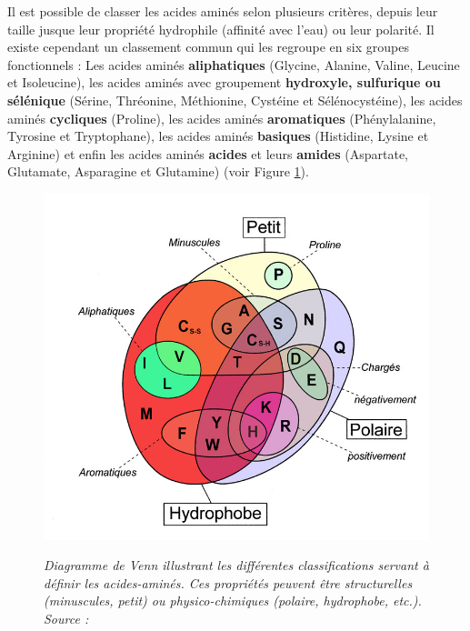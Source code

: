 

Il est possible de classer les acides aminés selon plusieurs critères, depuis leur taille jusque leur propriété hydrophile (affinité avec l'eau) ou leur polarité. Il existe cependant un classement commun qui les regroupe en six groupes fonctionnels : Les acides aminés \textbf{aliphatiques} (Glycine, Alanine, Valine, Leucine et Isoleucine), les acides aminés avec groupement \textbf{hydroxyle, sulfurique ou sélénique} (Sérine, Thréonine, Méthionine, Cystéine et Sélénocystéine), les acides aminés \textbf{cycliques} (Proline), les acides aminés \textbf{aromatiques} (Phénylalanine, Tyrosine et Tryptophane), les acides aminés \textbf{basiques} (Histidine, Lysine et Arginine) et enfin les acides aminés \textbf{acides} et leurs \textbf{amides} (Aspartate, Glutamate, Asparagine et Glutamine) (voir Figure \ref{Fig:diagramme_venn}).

\begin{figure}
  \centering
  {\includegraphics[width=0.65\linewidth]{./figures/ch1/diagramme_venn}}
    \caption[Diagramme de Venn illustrant les différentes classifications servant à définir les acides-aminés.]{\it Diagramme de Venn illustrant les différentes classifications servant à définir les acides-aminés. Ces propriétés peuvent être structurelles (minuscules, petit) ou physico-chimiques (polaire, hydrophobe, etc.). 
    Source : \cite{wikipedia_francais_2006}
    }
    \label{Fig:diagramme_venn}
  \hspace{0.2cm}
\end{figure}


